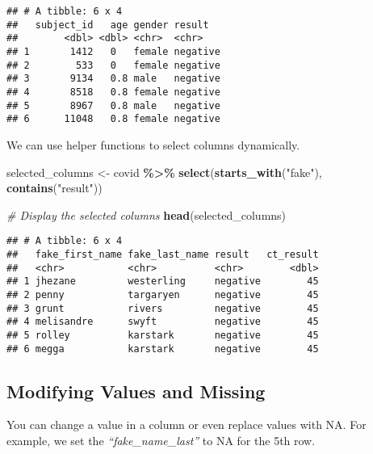 \documentclass[
]{book}
\newenvironment{Shaded}{\begin{snugshade}}{\end{snugshade}}
\newcommand{\CommentTok}[1]{\textcolor[rgb]{0.56,0.35,0.01}{\textit{#1}}}
\newcommand{\FunctionTok}[1]{\textcolor[rgb]{0.13,0.29,0.53}{\textbf{#1}}}
\newcommand{\NormalTok}[1]{#1}
\newcommand{\OtherTok}[1]{\textcolor[rgb]{0.56,0.35,0.01}{#1}}
\newcommand{\SpecialCharTok}[1]{\textcolor[rgb]{0.81,0.36,0.00}{\textbf{#1}}}
\newcommand{\StringTok}[1]{\textcolor[rgb]{0.31,0.60,0.02}{#1}}
\begin{document}
\begin{verbatim}
## # A tibble: 6 x 4
##   subject_id   age gender result  
##        <dbl> <dbl> <chr>  <chr>   
## 1       1412   0   female negative
## 2        533   0   female negative
## 3       9134   0.8 male   negative
## 4       8518   0.8 female negative
## 5       8967   0.8 male   negative
## 6      11048   0.8 female negative
\end{verbatim}

We can use helper functions to select columns dynamically.

\begin{Shaded}
\begin{Highlighting}[]
\NormalTok{selected\_columns }\OtherTok{\textless{}{-}}\NormalTok{ covid }\SpecialCharTok{\%\textgreater{}\%}
  \FunctionTok{select}\NormalTok{(}\FunctionTok{starts\_with}\NormalTok{(}\StringTok{"fake"}\NormalTok{), }\FunctionTok{contains}\NormalTok{(}\StringTok{"result"}\NormalTok{))}

\CommentTok{\# Display the selected columns}
\FunctionTok{head}\NormalTok{(selected\_columns)}
\end{Highlighting}
\end{Shaded}

\begin{verbatim}
## # A tibble: 6 x 4
##   fake_first_name fake_last_name result   ct_result
##   <chr>           <chr>          <chr>        <dbl>
## 1 jhezane         westerling     negative        45
## 2 penny           targaryen      negative        45
## 3 grunt           rivers         negative        45
## 4 melisandre      swyft          negative        45
## 5 rolley          karstark       negative        45
## 6 megga           karstark       negative        45
\end{verbatim}

\subsection{Modifying Values and Missing}\label{modifying-values-and-missing}

You can change a value in a column or even replace values with NA. For example, we set the \emph{``fake\_name\_last''} to NA for the 5th row.
\end{document}
